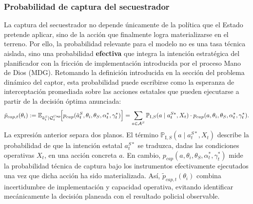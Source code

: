 \documentclass[12pt]{article}
\theoremstyle{definition}
\theoremstyle{remark}
\newcommand{\E}{\mathbb{E}}
\newcommand{\ProbI}[1]{\mathbb{P}_{\mathrm{I},#1}}
\newcommand{\1}{\mathbf{1}}
\begin{document}
\subsubsection{Probabilidad de captura del secuestrador}
\label{subsec:prob-captura}

La captura del secuestrador no depende únicamente de la política que el Estado pretende aplicar, sino de la acción que finalmente logra materializarse en el terreno. Por ello, la probabilidad relevante para el modelo no es una tasa técnica aislada, sino una probabilidad \textbf{efectiva} que integra la intención estratégica del planificador con la fricción de implementación introducida por el proceso Mano de Dios \textup{(}MDG\textup{)}. Retomando la definición introducida en la sección del problema dinámico del captor, esta probabilidad puede escribirse como la esperanza de interceptación promediada sobre las acciones estatales que pueden ejecutarse a partir de la decisión óptima anunciada:
\begin{equation}
\label{eq:p-cap-def}
\tilde{p}_{cap,t}(\theta_i)
:=
\E_{\tilde a_t^S\mid \mathcal Q_t^{\mathrm{Cap}}}\!\Bigl[
  p_{cap}(\tilde a_t^S,\theta_i,\theta_S,\alpha_t^\ast,\gamma_t^\ast)
\Bigr]
=
\sum_{a \in \mathcal{A}^S} \ProbI{S}(a \mid a_t^{S\ast}, X_t) \cdot p_{cap}(a, \theta_i, \theta_S, \alpha_t^\ast, \gamma_t^\ast).
\end{equation}
La expresión anterior separa dos planos. El término $\ProbI{S}(a \mid a_t^{S\ast}, X_t)$ describe la probabilidad de que la intención estatal $a_t^{S\ast}$ se traduzca, dadas las condiciones operativas $X_t$, en una acción concreta $a$. En cambio, $p_{cap}(a, \theta_i, \theta_S, \alpha_t^\ast, \gamma_t^\ast)$ mide la probabilidad técnica de captura bajo los instrumentos efectivamente ejecutados una vez que dicha acción ha sido materializada. Así, $\tilde{p}_{cap,t}(\theta_i)$ combina incertidumbre de implementación y capacidad operativa, evitando identificar mecánicamente la decisión planeada con el resultado policial observable.
\end{document}
